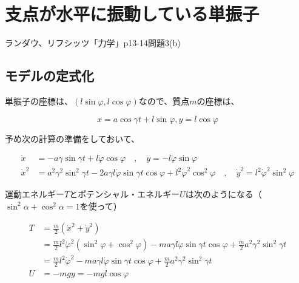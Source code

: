 \chapter{支点が水平に振動している単振子}

ランダウ、リフシッツ「力学」p13-14問題3(b)

\section{モデルの定式化}

\begin{comment}
    \begin{figure}[htbp]
        \begin{minipage}[b]{0.45\linewidth}
          \centering
          \texttt{[image: eps/horizontal.eps]}
          \caption{支点が水平に振動している単振子}
        \end{minipage}
      \end{figure}
\end{comment}

単振子の座標は、$(l\sin\varphi,l\cos\varphi)$なので、質点$m$の座標は、

\[x=a\cos\gamma t + l\sin\varphi, y = l\cos\varphi\]

予め次の計算の準備をしておいて、

\begin{align*}
   \dot{x} &= -a\gamma\sin\gamma t +l\dot{\varphi}\cos\varphi \quad,\quad \dot{y} = -l\dot{\varphi}\sin\varphi\\
   \dot{x}^2 &= a^2\gamma^2\sin^2\gamma t - 2a\gamma l\dot{\varphi}\sin\gamma t\cos\varphi + l^2\dot{\varphi}^2\cos^2\varphi\quad,\quad \dot{y}^2 =l^2\dot{\varphi}^2\sin^2\varphi
\end{align*}

運動エネルギー$T$とポテンシャル・エネルギー$U$は次のようになる（$\sin^2\alpha+\cos^2\alpha=1$を使って）

\begin{align*}
   T &= \frac{m}{2}(\dot{x}^2+\dot{y}^2)\\
   &=\frac{m}{2}l^2\dot{\varphi}^2\left(\sin^2\varphi+\cos^2\varphi\right) -ma\gamma l\dot{\varphi}\sin\gamma t\cos\varphi + \frac{m}{2}a^2\gamma^2\sin^2\gamma t\\
   &=\frac{m}{2}l^2\dot{\varphi}^2 -ma\gamma l\dot{\varphi}\sin\gamma t\cos\varphi + \frac{m}{2}a^2\gamma^2\sin^2\gamma t\\
   U &= -mgy = -mgl\cos\varphi
\end{align*}

